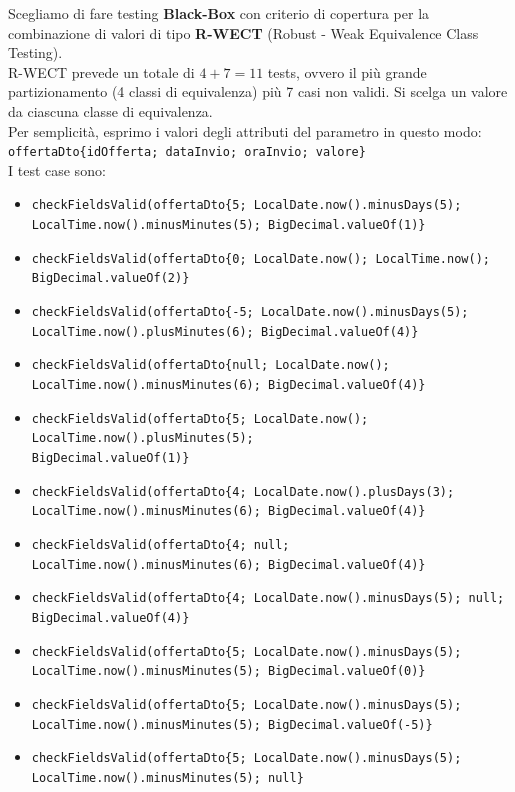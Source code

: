             \noindent Scegliamo di fare testing \textbf{Black-Box} con criterio di copertura per la combinazione di valori di tipo \textbf{R-WECT} (Robust - Weak Equivalence Class Testing).\\
            R-WECT prevede un totale di \(4+7 = 11\) tests, ovvero il più grande partizionamento (4 classi di equivalenza) più 7 casi non validi. Si scelga un valore da ciascuna classe di equivalenza.\\

            \noindent Per semplicità, esprimo i valori degli attributi del parametro in questo modo: \\
            \texttt{offertaDto\{idOfferta; dataInvio; oraInvio; valore\}}\\
            
            \noindent I test case sono:

            \begin{itemize}
                \item \texttt{checkFieldsValid(offertaDto\{5; LocalDate.now().minusDays(5); LocalTime.now().minusMinutes(5); BigDecimal.valueOf(1)\}} %
                \item \texttt{checkFieldsValid(offertaDto\{0; LocalDate.now(); LocalTime.now(); BigDecimal.valueOf(2)\}} %
                \item \texttt{checkFieldsValid(offertaDto\{-5; LocalDate.now().minusDays(5); LocalTime.now().plusMinutes(6); BigDecimal.valueOf(4)\}} %
                \item \texttt{checkFieldsValid(offertaDto\{null; LocalDate.now(); LocalTime.now().minusMinutes(6); BigDecimal.valueOf(4)\}} %
                \item \texttt{checkFieldsValid(offertaDto\{5; LocalDate.now(); LocalTime.now().plusMinutes(5);\\ BigDecimal.valueOf(1)\}} %
                \item \texttt{checkFieldsValid(offertaDto\{4; LocalDate.now().plusDays(3); LocalTime.now().minusMinutes(6); BigDecimal.valueOf(4)\}} %
                \item \texttt{checkFieldsValid(offertaDto\{4; null; LocalTime.now().minusMinutes(6); BigDecimal.valueOf(4)\}} %
                \item \texttt{checkFieldsValid(offertaDto\{4; LocalDate.now().minusDays(5); null; BigDecimal.valueOf(4)\}} %
                \item \texttt{checkFieldsValid(offertaDto\{5; LocalDate.now().minusDays(5); LocalTime.now().minusMinutes(5); BigDecimal.valueOf(0)\}} %
                \item \texttt{checkFieldsValid(offertaDto\{5; LocalDate.now().minusDays(5); LocalTime.now().minusMinutes(5); BigDecimal.valueOf(-5)\}} %
                \item \texttt{checkFieldsValid(offertaDto\{5; LocalDate.now().minusDays(5); LocalTime.now().minusMinutes(5); null\}} %
            \end{itemize}

